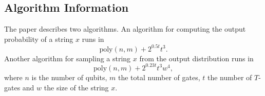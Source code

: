 \documentclass[11pt]{article}
\begin{document}
\subsection*{Algorithm Information}


The paper \cite{bravyi-gosset} describes two algorithms. An algorithm for computing the output probability of a string $x$ runs in
    $$ \text{poly}(n,m) + 2^{0.5t} t^3. $$
    Another algorithm for sampling a string $x$ from the output distribution runs in
    $$ \text{poly}(n,m) + 2^{0.23t}t^3 w^4,$$
    where $n$ is the number of qubits, $m$ the total number of gates, $t$ the number of $T$-gates and $w$ the size of the string $x$.

\clearpage
\end{document}
